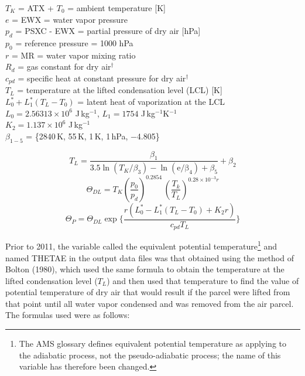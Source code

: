 \documentclass[
  english,
]{book}
\begin{document}
\(T_K\) = ATX + \(T_0\) = ambient temperature {[}K{]}\\
\(e\) = EWX = water vapor pressure\\
\(p_d\) = PSXC - EWX = partial pressure of dry air {[}hPa{]}\\
\(p_{0}\) = reference pressure = 1000 hPa\\
\(r\) = MR = water vapor mixing ratio\\
\(R_{d}\) = gas constant for dry air\(^{\dagger}\)\\
\(c_{pd}\) = specific heat at constant pressure for dry air\(^{\dagger}\)\\
\(T_L\) = temperature at the lifted condensation level (LCL) {[}K{]}\\
\(L_0^*+L_1^*(T_L-T_0)\) = latent heat of vaporization at the LCL\\
\(L_0=2.56313 × 10^6\) J\(\,\)kg\(^{-1}\), \(L_1=1754\) J\(\,\)kg\(^{-1}\)K\(^{-1}\)\\
\(K_2=1.137 × 10^6\) J\(\,\)kg\(^{-1}\)\\
\(\beta_{1-5}\) = \{2840 K, 55 K, 1 K, 1 hPa, −4.805\}

\begin{equation}
T_{L}=\frac{\beta_{1}}{3.5\ln(T_{K}/\beta_{3})-\ln(\mathrm{e/\beta_{4}})+\beta_{5}}+\beta_{2}
\label{eq:TLCLTP}
\end{equation}
\begin{equation}
\Theta_{DL}=T_{K}(\frac{p_{0}}{p_{d}})^{0.2854}\,(\frac{T_{k}}{T_{L}})^{0.28\times10^{-3}r}
\label{eq:THETADLbox}
\end{equation}
\begin{equation}
\Theta_{P}=\Theta_{DL}\exp\{\frac{r(L_{0}^{*}-L_{1}^{*}(T_{L}-T_{0})+K_{2}r)}{c_{pd}T_{L}}\}
\label{eq:THETAPbox}
\end{equation}

Prior to 2011, the variable called the equivalent potential temperature\footnote{The AMS glossary defines equivalent potential temperature as applying to the adiabatic process, not the pseudo-adiabatic process; the name of this variable has therefore been changed.}
and named THETAE in the output data files was that obtained using the method of Bolton (1980), which used the same formula to obtain the temperature at the lifted condensation level (\(T_L\)) and then used that temperature to find the value of potential temperature of dry air that would result if the parcel were lifted from that point until all water vapor condensed and was removed from the air parcel. The formulas used were as follows:
\end{document}
